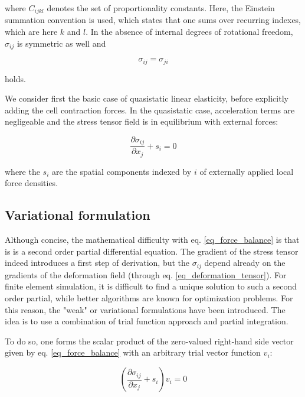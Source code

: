 \documentclass[11pt]{amsart}
\begin{document}
where $C_{ijkl}$ denotes the set of proportionality constants. Here, the Einstein summation convention is used, which states that one sums over recurring indexes, which are here $k$ and $l$. In the absence of internal degrees of rotational freedom, $\sigma_{ij}$ is symmetric as well\cite{mclennan_symmetry_1966} and

\begin{equation}
\sigma_{ij}=\sigma_{ji}
\end{equation}

holds.

We consider first the basic case of quasistatic linear elasticity, before explicitly adding the cell contraction forces. In the quasistatic case, acceleration terms are negligeable and the stress tensor field is in equilibrium with external forces:

\begin{equation}
\frac{\partial \sigma_{ij}}{\partial x_j}+s_i = 0 \label{eq_force_balance}
\end{equation}

where the $s_i$ are the spatial components indexed by $i$ of externally applied local force densities.

\subsection{Variational formulation}

Although concise, the mathematical difficulty with eq. \ref{eq_force_balance} is that is is a second order partial differential equation. The gradient of the stress tensor indeed introduces a first step of derivation, but the $\sigma_{ij}$ depend already on the gradients of the deformation field (through eq. \ref{eq_deformation_tensor}). For finite element simulation, it is difficult to find a unique solution to such a second order partial, while better algorithms are known for optimization problems. For this reason, the "weak" or variational formulations have been introduced\cite{bower_applied_2010}. The idea is to use a combination of trial function approach and partial integration\cite{bower_applied_2010}.  

To do so, one forms the scalar product of the zero-valued right-hand side vector given by eq. \ref{eq_force_balance} with an arbitrary trial vector function $v_i$: 

\begin{equation}
\left(\frac{\partial \sigma_{ij}}{\partial x_j}+s_i \right) v_i = 0 \label{eq_trial_function}
\end{equation}
\end{document}
